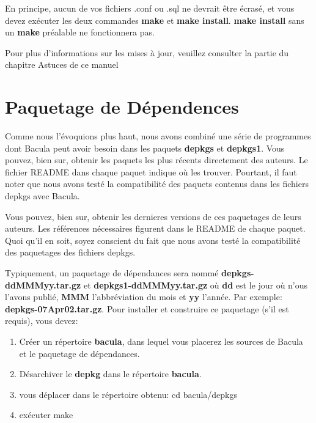  En principe, aucun de vos fichiers .conf ou .sql ne devrait \^etre \'ecras\'e, 
 et vous devez exécuter les deux commandes  {\bf make} et {\bf make install}. 
 {\bf make install} sans un {\bf make} préalable ne fonctionnera pas.
 
Pour plus d'informations sur les mises \`a jour, veuillez consulter la partie 
 du chapitre Astuces de ce manuel

\section{Paquetage de D\'ependences}
\label{Dependency}

Comme nous l'\'evoquions plus haut, nous avons combin\'e une s\'erie de
programmes dont Bacula peut avoir besoin dans les paquets {\bf depkgs} et {\bf
depkgs1}. Vous pouvez, bien sur, obtenir les paquets les plus r\'ecents
directement des auteurs. Le fichier README dans chaque paquet indique o\`u les
trouver. Pourtant, il faut noter que nous avons test\'e la compatibilit\'e des
paquets contenus dans les fichiers depkgs avec Bacula. 

Vous pouvez, bien sur, obtenir les dernieres versions de ces paquetages de
leurs auteurs. Les r\'ef\'erences n\'ecessaires figurent dans le README de
chaque paquet. Quoi qu'il en soit, soyez conscient du fait que nous avons
test\'e la compatibilit\'e des paquetages des fichiers depkgs. 

Typiquement, un paquetage de d\'ependances sera nomm\'e {\bf
depkgs-ddMMMyy.tar.gz} et {\bf depkgs1-ddMMMyy.tar.gz} o\`u {\bf dd} est le
jour o\`u n'ous l'avons publi\'e, {\bf MMM} l'abbr\'eviation du mois et {\bf
yy} l'ann\'ee. Par exemple: {\bf depkgs-07Apr02.tar.gz}. Pour installer et
construire ce paquetage (s'il est requis), vous devez: 

\begin{enumerate}
\item Cr\'eer un r\'epertoire {\bf bacula}, dans lequel vous placerez les
   sources de Bacula et le paquetage de d\'ependances. 
\item D\'esarchiver le {\bf depkg} dans le r\'epertoire {\bf bacula}. 
\item vous d\'eplacer dans le r\'epertoire obtenu: cd bacula/depkgs 
\item ex\'ecuter make 
   \end{enumerate}

